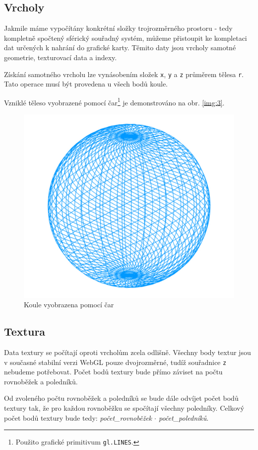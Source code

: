 \newpage


\subsection{Vrcholy}
Jakmile máme vypočítány konkrétní složky trojrozměrného prostoru - tedy kompletně spočtený sférický souřadný systém, můžeme přistoupit ke kompletaci dat určených k nahrání do grafické karty. Těmito daty jsou vrcholy samotné geometrie, texturovací data a indexy. 

Získání samotného vrcholu lze vynásobením složek \texttt{x}, \texttt{y} a \texttt{z} průměrem tělesa \texttt{r}. Tato operace musí být provedena u všech bodů koule.

Vzniklé těleso vyobrazené pomocí čar\footnote{Použito grafické primitivum \texttt{gl.LINES}.} je demonstrováno na obr. \ref{img:3}.


\begin{figure}[h]
	\label{img:3}
	\centering
	\includegraphics[scale=1.0,angle=0,width=0.7\linewidth]{obrazky-figures/vertex}
	\caption{Koule vyobrazena pomocí čar}
	\label{fig:geom2}
\end{figure}


\subsection{Textura}
Data textury se počítají oproti vrcholům zcela odlišně. Všechny body textur jsou v současné stabilní verzi WebGL pouze dvojrozměrné, tudíž souřadnice \texttt{z} nebudeme potřebovat.
Počet bodů textury bude přímo záviset na počtu rovnoběžek a poledníků.

Od zvoleného počtu rovnoběžek a poledníků se bude dále odvíjet počet bodů textury tak, že pro každou rovnoběžku se spočítají všechny poledníky. Celkový počet bodů textury bude tedy: \textit{počet\_rovnoběžek $\cdot$ počet\_poledníků}.

